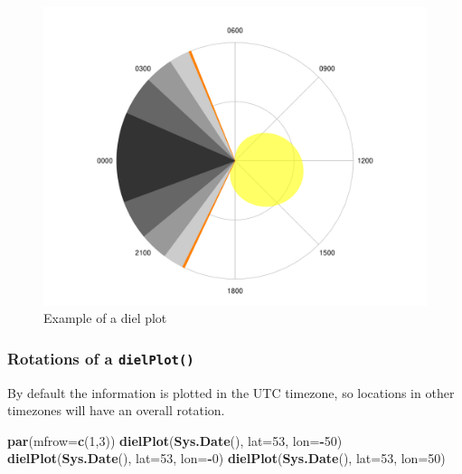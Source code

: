 \documentclass[
]{book}
\newenvironment{Shaded}{\begin{snugshade}}{\end{snugshade}}
\newcommand{\AttributeTok}[1]{\textcolor[rgb]{0.13,0.29,0.53}{#1}}
\newcommand{\DecValTok}[1]{\textcolor[rgb]{0.00,0.00,0.81}{#1}}
\newcommand{\FunctionTok}[1]{\textcolor[rgb]{0.13,0.29,0.53}{\textbf{#1}}}
\newcommand{\NormalTok}[1]{#1}
\newcommand{\SpecialCharTok}[1]{\textcolor[rgb]{0.81,0.36,0.00}{\textbf{#1}}}
\begin{document}
\begin{figure}

{\centering \includegraphics[width=0.9\linewidth]{_main_files/figure-latex/diel-plot-1-1} 

}

\caption{Example of a diel plot}\label{fig:diel-plot-1}
\end{figure}

\hypertarget{rotations-of-a-dielplot}{%
\subsubsection{\texorpdfstring{Rotations of a \texttt{dielPlot()}}{Rotations of a dielPlot()}}\label{rotations-of-a-dielplot}}

By default the information is plotted in the UTC timezone, so locations in other timezones will have an overall rotation.

\begin{Shaded}
\begin{Highlighting}[]
\FunctionTok{par}\NormalTok{(}\AttributeTok{mfrow=}\FunctionTok{c}\NormalTok{(}\DecValTok{1}\NormalTok{,}\DecValTok{3}\NormalTok{))}
\FunctionTok{dielPlot}\NormalTok{(}\FunctionTok{Sys.Date}\NormalTok{(), }\AttributeTok{lat=}\DecValTok{53}\NormalTok{, }\AttributeTok{lon=}\SpecialCharTok{{-}}\DecValTok{50}\NormalTok{)}
\FunctionTok{dielPlot}\NormalTok{(}\FunctionTok{Sys.Date}\NormalTok{(), }\AttributeTok{lat=}\DecValTok{53}\NormalTok{, }\AttributeTok{lon=}\SpecialCharTok{{-}}\DecValTok{0}\NormalTok{)}
\FunctionTok{dielPlot}\NormalTok{(}\FunctionTok{Sys.Date}\NormalTok{(), }\AttributeTok{lat=}\DecValTok{53}\NormalTok{, }\AttributeTok{lon=}\DecValTok{50}\NormalTok{)}
\end{Highlighting}
\end{Shaded}
\end{document}
